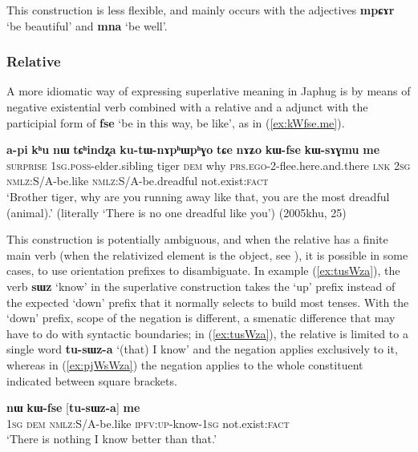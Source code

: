 \documentclass[oneside,a4paper,11pt]{article}
\newcommand{\ipa}[1]{{\phon\textbf{#1}}} %
\newcommand{\forme}[2]{\ipa{#1} `#2'}
\begin{document}
This construction is less flexible, and mainly occurs with the adjectives \forme{mpɕɤr}{be beautiful} and \forme{mna}{be well}.

 \subsubsection{Relative} \label{sec:relative.superlative}
 A more idiomatic way of expressing superlative meaning in Japhug is by means of negative existential verb combined with a relative and a adjunct with the participial form of \forme{fse}{be in this way, be like}, as in (\ref{ex:kWfse.me}).
 
 \begin{exe}
\ex \label{ex:kWfse.me}
\gll \ipa{ama} 	\ipa{a-pi} 	\ipa{kʰu} 	\ipa{nɯ} 	\ipa{tɕʰindʐa} 	\ipa{ku-tɯ-nɤpʰɯpʰɣo} 	\ipa{tɕe}  \ipa{nɤʑo} 	\ipa{kɯ-fse} 	\ipa{kɯ-sɤɣmu} 	\ipa{me} 	\\
\textsc{surprise} \textsc{1sg.poss}-elder.sibling tiger \textsc{dem} why \textsc{prs.ego}-2-flee.here.and.there \textsc{lnk} \textsc{2sg}  \textsc{nmlz}:S/A-be.like   \textsc{nmlz}:S/A-be.dreadful  not.exist:\textsc{fact} \\
\glt `Brother tiger, why are you running away like that, you are the most dreadful (animal).' (literally `There is no one dreadful like you') (2005khu, 25)
\end{exe}

This construction is potentially ambiguous, and when the relative has a finite main verb (when the relativized element is the object, see \citealt{jacques16relatives}), it is possible in some cases, to use orientation prefixes to disambiguate. In example (\ref{ex:tusWza}), the verb \forme{sɯz}{know} in the superlative construction takes the `up' prefix instead of the expected `down' prefix that it normally selects to build most tenses. With the  `down' prefix, scope of the negation is different, a smenatic difference that may have to do with syntactic boundaries; in (\ref{ex:tusWza}), the relative is limited to a single word \ipa{tu-sɯz-a} `(that) I know' and the negation applies exclusively to it, whereas in (\ref{ex:pjWsWza}) the negation applies to the whole constituent indicated between square brackets.
 

\begin{exe}
\ex \label{ex:tusWza}
\gll \ipa{aʑo} 	\ipa{nɯ} 	\ipa{kɯ-fse} 	[\ipa{tu-sɯz-a}] 	\ipa{me} \\
\textsc{1sg} \textsc{dem} \textsc{nmlz}:S/A-be.like \textsc{ipfv:up}-know-\textsc{1sg} not.exist:\textsc{fact} \\
\glt `There is nothing I know better than that.'
\end{exe}
\end{document}
